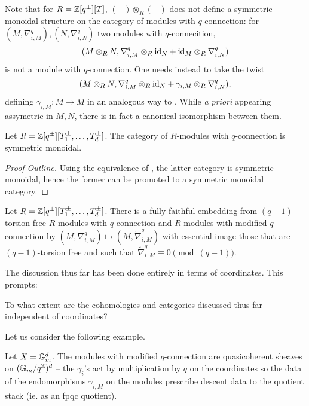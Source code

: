 Note that for $R=\mathbb{Z}[q^{\pm}][\underline{T}]$, $(-)\otimes_{R}(-)$ does not define a symmetric monoidal structure on the category of modules with $q$-connection: for $(M,\nabla_{i,M}^{q}),(N,\nabla_{i,N}^{q})$ two modules with $q$-connecition, $$(M\otimes_{R} N,\nabla_{i,M}^{q}\otimes_{R}\mathrm{id}_{N}+\mathrm{id}_{M}\otimes_{R}\nabla_{i,N}^{q})$$ is not a module with $q$-connection. One needs instead to take the twist $$(M\otimes_{R} N,\nabla_{i,M}^{q}\otimes_{R}\mathrm{id}_{N}+\gamma_{i,M}\otimes_{R}\nabla_{i,N}^{q}),$$
defining $\gamma_{i,M}:M\to M$ in an analogous way to . While \emph{a priori} appearing assymetric in $M,N$, there is in fact a canonical isomorphism between them. 
\begin{proposition}
    Let $R=\mathbb{Z}[q^{\pm}][T_{1}^{\pm},\dots,T_{d}^{\pm}]$. The category of $R$-modules with $q$-connection is symmetric monoidal. 
\end{proposition}
\begin{proof}[Proof Outline]
    Using the equivalence of , the latter category is symmetric monoidal, hence the former can be promoted to a symmetric monoidal category. 
\end{proof}
\begin{proposition}
    Let $R=\mathbb{Z}[q^{\pm}][T_{1}^{\pm},\dots,T_{d}^{\pm}]$. There is a fully faithful embedding from $(q-1)$-torsion free $R$-modules with $q$-connection and $R$-modules with modified $q$-connection by $(M,\nabla_{i,M}^{q})\mapsto(M,\widetilde{\nabla}_{i,M}^{q})$ with essential image those that are $(q-1)$-torsion free and such that $\widetilde{\nabla}_{i,M}^{q}\equiv0\pmod{(q-1)}$. 
\end{proposition}
The discussion thus far has been done entirely in terms of coordinates. This prompts:
\begin{question}
    To what extent are the cohomologies and categories discussed thus far independent of coordinates? 
\end{question}
Let us consider the following example. 
\begin{example}\label{ex: Habiro stack on Gm}
    Let $X=\mathbb{G}_{m}^{d}$. The modules with modified $q$-connection are quasicoherent sheaves on $(\mathbb{G}_{m}/q^{\mathbb{Z}})^{d}$ -- the $\gamma_{i}$'s act by multiplication by $q$ on the coordinates so the data of the endomorphisms $\gamma_{i,M}$ on the modules prescribe descent data to the quotient stack (ie. as an fpqc quotient).
\end{example}
